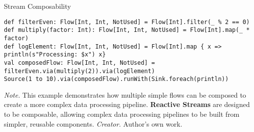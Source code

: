 \begin{table}[H]
\caption{Stream Composability}
\begin{lstlisting}
def filterEven: Flow[Int, Int, NotUsed] = Flow[Int].filter(_ % 2 == 0)
def multiply(factor: Int): Flow[Int, Int, NotUsed] = Flow[Int].map(_ * factor)
def logElement: Flow[Int, Int, NotUsed] = Flow[Int].map { x => println(s"Processing: $x") x}
val composedFlow: Flow[Int, Int, NotUsed] = filterEven.via(multiply(2)).via(logElement)
Source(1 to 10).via(composedFlow).runWith(Sink.foreach(println))
\end{lstlisting}
\small
\textit{Note.} This example demonstrates how multiple simple flows can be composed to create a more complex data processing pipeline. \textbf{Reactive Streams} are designed to be composable, allowing complex data processing pipelines to be built from simpler, reusable components.
\textit{Creator.} Author's own work.
\end{table}